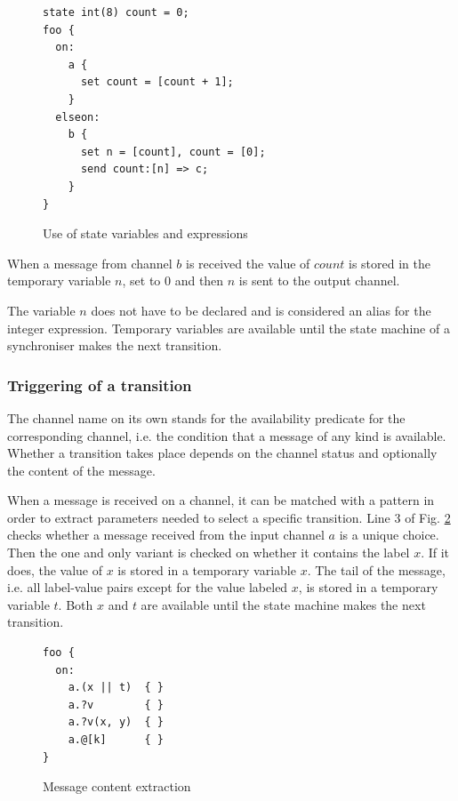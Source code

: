\begin{figure}[h!]
\lstset{numbers=left, numberstyle=\small, stepnumber=1, numbersep=8pt}
\begin{lstlisting}[frame=single]
state int(8) count = 0;
foo {
  on:
    a {
      set count = [count + 1];
    }
  elseon:
    b {
      set n = [count], count = [0];
      send count:[n] => c;
    }
}
\end{lstlisting}
\caption{Use of state variables and expressions}
\label{sync_state_exp}
\end{figure}

When a message from channel $b$ is received the value of $count$ is stored in the temporary variable $n$, set to 0 and then $n$ is sent to the output channel.

The variable $n$ does not have to be declared and is considered an alias for the integer expression. Temporary variables are available until the state machine of a synchroniser makes the next transition.


  \subsubsection{Triggering of a transition}
The channel name on its own stands for the availability predicate for the corresponding channel, i.e. the condition that a message of any kind is available. Whether a transition takes place depends on the channel status and optionally the content of the message.

When a message is received on a channel, it can be matched with a pattern in order to extract parameters needed to select a specific transition. Line 3 of Fig. \ref{sync_trans} checks whether a message received from the input channel $a$ is a unique choice. Then the one and only variant is checked on whether it contains the label $x$. If it does, the value of $x$ is stored in a temporary variable $x$. The tail of the message, i.e. all label-value pairs except for the value labeled $x$, is stored in a temporary variable $t$. Both $x$ and $t$ are available until the state machine makes the next transition.

\begin{figure}[h!]
\lstset{numbers=left, numberstyle=\small, stepnumber=1, numbersep=8pt}
\begin{lstlisting}[frame=single]
foo {
  on:
    a.(x || t)  { }
    a.?v        { }
    a.?v(x, y)  { }
    a.@[k]      { }
}
\end{lstlisting}
\caption{Message content extraction}
\label{sync_trans}
\end{figure}

